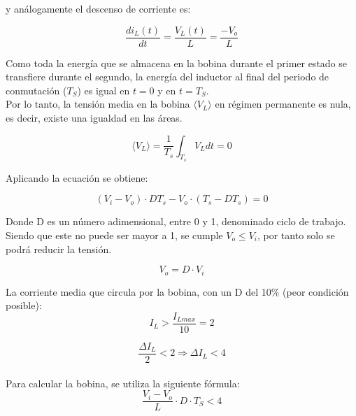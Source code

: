 y análogamente el descenso de corriente es:

\begin{equation}
\frac{di_L(t)}{dt} = \frac{V_L(t)}{L} = \frac{-V_o}{L}    
\end{equation}

Como toda la energía que se almacena en la bobina durante el primer estado se transfiere durante el segundo, la energía del inductor al final del periodo de conmutación ($T_S$) es igual en $t = 0$ y en $t = T_S$.\\

Por lo tanto, la tensión media en la bobina $\langle V_L \rangle$ en régimen permanente es nula, es decir, existe una igualdad en las áreas.

\begin{equation}
    \langle V_L \rangle = \frac{1}{T_s}\int_{T_s} V_L dt = 0
\end{equation}

Aplicando la ecuación se obtiene:

\begin{equation}
    (V_i - V_o) \cdot DT_s - V_o \cdot (T_s - DT_s) = 0
\end{equation}

Donde D es un número adimensional, entre 0 y 1, denominado ciclo de trabajo. Siendo que este no puede ser mayor a 1, se cumple $V_o \leq V_i$, por tanto solo se podrá reducir la tensión.

\begin{equation}
    V_o = D \cdot V_i
    \label{eq:D}
\end{equation}

La corriente media que circula por la bobina, con un D del 10\% (peor condición posible):\\

\begin{equation}
    I_L > \frac{I_{Lmax}}{10} = 2
\end{equation}



\begin{equation}
    \frac{\Delta I_L}{2} < 2 \Rightarrow \Delta I_L < 4
\end{equation}\\

Para calcular la bobina, se utiliza la siguiente fórmula:\\

\begin{equation}
    \frac{V_i - V_o}{L} \cdot D \cdot T_S < 4
\end{equation}\\

